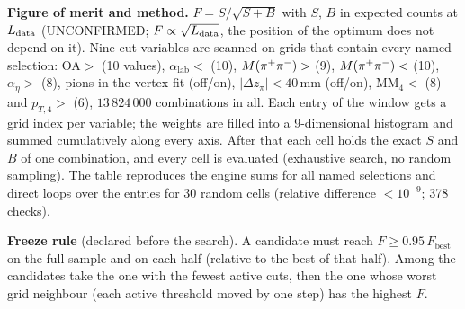 \textbf{Figure of merit and method.} $F = S/\sqrt{S+B}$ with $S$, $B$ in expected counts at
$L_{\mathrm{data}}$ (UNCONFIRMED; $F\propto\sqrt{L_{\mathrm{data}}}$, the position of the optimum does not depend on it).
Nine cut variables are scanned on grids that contain every named selection: OA$>$ (10 values),
$\alpha_{\mathrm{lab}}<$ (10), $M(\pi^{+}\pi^{-})>$ (9), $M(\pi^{+}\pi^{-})<$ (10), $\alpha_\eta>$ (8), pions in the
vertex fit (off/on), $|\Delta z_\pi|<40$\,mm (off/on), $\mathrm{MM}_4<$ (8) and $p_{T,4}>$ (6),
$13\,824\,000$ combinations in all. Each entry of the window gets a grid index per variable; the weights are
filled into a 9-dimensional histogram and summed cumulatively along every axis. After that each
cell holds the exact $S$ and $B$ of one combination, and every cell is evaluated (exhaustive
search, no random sampling). The table reproduces the engine sums for all named selections and
direct loops over the entries for 30 random cells (relative difference $<10^{-9}$; 378 checks).

\textbf{Freeze rule} (declared before the search). A candidate must reach $F\ge0.95\,F_{\mathrm{best}}$ on
the full sample and on each half (relative to the best of that half). Among the candidates take
the one with the fewest active cuts, then the one whose worst grid neighbour (each active
threshold moved by one step) has the highest $F$.

